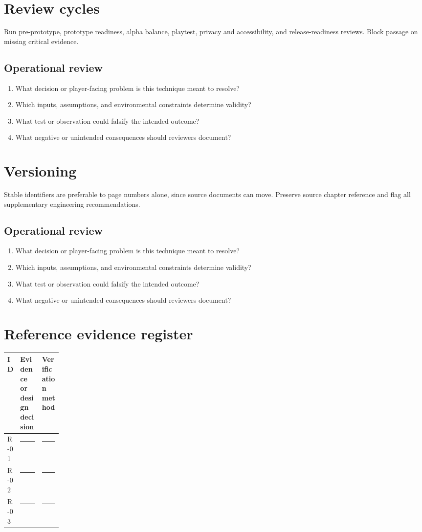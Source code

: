 \documentclass[11pt]{article}
\begin{document}
\section{Review cycles}
Run pre-prototype, prototype readiness, alpha balance, playtest, privacy and accessibility, and release-readiness reviews. Block passage on missing critical evidence.


\subsection{Operational review}
\begin{enumerate}
\item What decision or player-facing problem is this technique meant to resolve?
\item Which inputs, assumptions, and environmental constraints determine validity?
\item What test or observation could falsify the intended outcome?
\item What negative or unintended consequences should reviewers document?
\end{enumerate}

\section{Versioning}
Stable identifiers are preferable to page numbers alone, since source documents can move. Preserve source chapter reference and flag all supplementary engineering recommendations.


\subsection{Operational review}
\begin{enumerate}
\item What decision or player-facing problem is this technique meant to resolve?
\item Which inputs, assumptions, and environmental constraints determine validity?
\item What test or observation could falsify the intended outcome?
\item What negative or unintended consequences should reviewers document?
\end{enumerate}

\section{Reference evidence register}
\begin{tabularx}{\linewidth}{@{}p{0.13\linewidth}X X@{}}\toprule ID & Evidence or design decision & Verification method\\\midrule
R-01 & \rule{0.95\linewidth}{0.4pt} & \rule{0.95\linewidth}{0.4pt}\\[0.4cm]
R-02 & \rule{0.95\linewidth}{0.4pt} & \rule{0.95\linewidth}{0.4pt}\\[0.4cm]
R-03 & \rule{0.95\linewidth}{0.4pt} & \rule{0.95\linewidth}{0.4pt}\\\bottomrule\end{tabularx}
\end{document}
